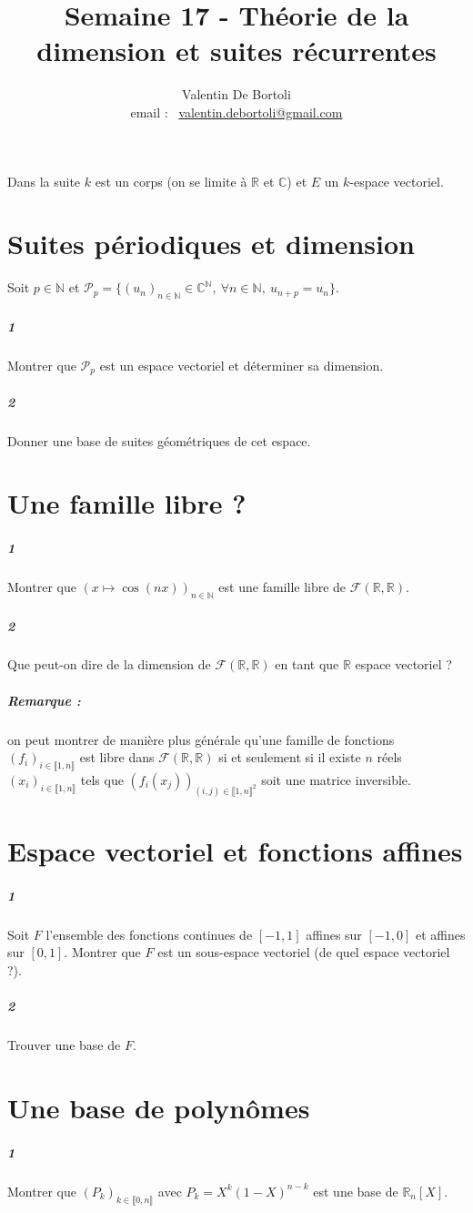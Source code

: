 \documentclass[10pt,a4paper]{article}
\title{Semaine 17 - Théorie de la dimension et suites récurrentes}
\author{Valentin De Bortoli \\ email : \ \href{mailto:valentin.debortoli@gmail.com}{valentin.debortoli@gmail.com}}
\date{}
\begin{document}
\maketitle
Dans la suite $k$ est un corps (on se limite à $\mathbb{R}$ et $\mathbb{C}$) et $E$ un $k$-espace vectoriel.

\section{Suites périodiques et dimension}
Soit $p \in \mathbb{N}$ et $\mathcal{P}_p= \lbrace (u_n)_{n \in \mathbb{N}} \in \mathbb{C}^{\mathbb{N}}, \ \forall n \in \mathbb{N}, \ u_{n+p}=u_n \rbrace$.
\subparagraph{1}Montrer que $\mathcal{P}_p$ est un espace vectoriel et déterminer sa dimension.
\subparagraph{2}Donner une base de suites géométriques de cet espace.

\section{Une famille libre ?}
\subparagraph{1}Montrer que $(x \mapsto\cos(nx))_{n \in \mathbb{N}}$ est une famille libre de $\mathcal{F}(\mathbb{R},\mathbb{R})$.
\subparagraph{2}Que peut-on dire de la dimension de $\mathcal{F}(\mathbb{R},\mathbb{R})$ en tant que $\mathbb{R}$ espace vectoriel ?

\subparagraph{Remarque :} on peut montrer de manière plus générale qu'une famille de fonctions $(f_i)_{i \in \llbracket 1,n \rrbracket}$ est libre dans $\mathcal{F}(\mathbb{R},\mathbb{R})$ si et seulement si il existe $n$ réels $(x_i)_{i \in \llbracket 1,n \rrbracket}$ tels que $(f_i(x_j))_{(i,j) \in \llbracket 1,n\rrbracket^2}$ soit une matrice inversible. 

\section{Espace vectoriel et fonctions affines}
\subparagraph{1}Soit $F$ l'ensemble des fonctions continues de $[-1,1]$ affines sur $[-1,0]$ et affines sur $[0,1]$. Montrer que $F$ est un sous-espace vectoriel (de quel espace vectoriel ?).
\subparagraph{2}Trouver une base de $F$. 

\section{Une base de polynômes}
\subparagraph{1}Montrer que $(P_k)_{k \in \llbracket 0,n \rrbracket}$ avec $P_k=X^k(1-X)^{n-k}$ est une base de $\mathbb{R}_n[X]$. 
\end{document}
